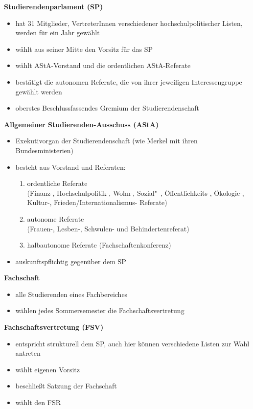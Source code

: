 \textbf{Studierendenparlament (SP)}
\begin{itemize}
  \item hat 31 Mitglieder, VertreterInnen verschiedener hochschulpolitischer Listen, werden für ein Jahr gewählt
  \item wählt aus seiner Mitte den Vorsitz für das SP
  \item wählt AStA-Vorstand und die ordentlichen AStA-Referate
  \item bestätigt die autonomen Referate, die von ihrer jeweiligen Interessengruppe gewählt werden
  \item oberstes Beschlussfassendes Gremium der Studierendenschaft
\end{itemize}

\textbf{Allgemeiner Studierenden-Ausschuss (AStA)}
\begin{itemize}
  \item Exekutivorgan der Studierendenschaft (wie Merkel mit ihren Bundesministerien)
  \item besteht aus Vorstand und Referaten:
    \begin{enumerate}
      \item ordentliche Referate \\ (Finanz-, Hochschulpolitik-, Wohn-, Sozial"~, Öffentlichkeits-, Ökologie-, Kultur-, Frieden/Internationalismus- Referate)
      \item autonome Referate \\ (Frauen-, Lesben-, Schwulen- und Behindertenreferat)
      \item halbautonome Referate (Fachschaftenkonferenz)
    \end{enumerate}
  \item auskunftspflichtig gegenüber dem SP
\end{itemize}

\textbf{Fachschaft}
\begin{itemize}
  \item alle Studierenden eines Fachbereiches
  \item wählen jedes Sommersemester die Fachschaftsvertretung                                                  
\end{itemize}

\textbf{Fachschaftsvertretung (FSV)}
\begin{itemize}
  \item entspricht strukturell dem SP, auch hier können verschiedene Listen zur Wahl antreten
  \item wählt eigenen Vorsitz
  \item beschließt Satzung der Fachschaft
  \item wählt den FSR
\end{itemize}

